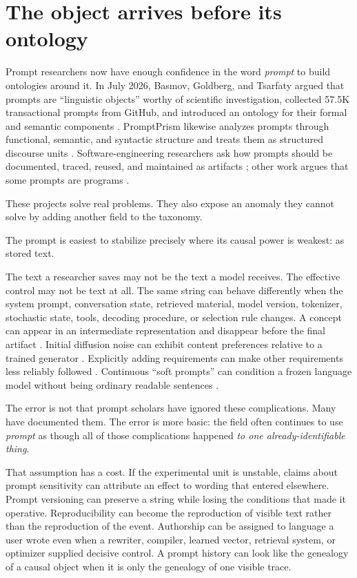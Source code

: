 \documentclass[11pt]{article}
\begin{document}
\section{The object arrives before its ontology}

Prompt researchers now have enough confidence in the word \emph{prompt} to build ontologies around it. In July 2026, Basmov, Goldberg, and Tsarfaty argued that prompts are ``linguistic objects'' worthy of scientific investigation, collected 57.5K transactional prompts from GitHub, and introduced an ontology for their formal and semantic components \citep{Basmov2026PromptsWild}. PromptPrism likewise analyzes prompts through functional, semantic, and syntactic structure and treats them as structured discourse units \citep{Jeoung2026PromptPrism}. Software-engineering researchers ask how prompts should be documented, traced, reused, and maintained as artifacts \citep{Villamizar2025PromptsArtifacts}; other work argues that some prompts are programs \citep{Liang2025PromptsPrograms}.

These projects solve real problems. They also expose an anomaly they cannot solve by adding another field to the taxonomy.

The prompt is easiest to stabilize precisely where its causal power is weakest: as stored text.

The text a researcher saves may not be the text a model receives. The effective control may not be text at all. The same string can behave differently when the system prompt, conversation state, retrieved material, model version, tokenizer, stochastic state, tools, decoding procedure, or selection rule changes. A concept can appear in an intermediate representation and disappear before the final artifact \citep{Agarwal2023ASTAR}. Initial diffusion noise can exhibit content preferences relative to a trained generator \citep{Mao2023InitialImageEditing}. Explicitly adding requirements can make other requirements less reliably followed \citep{Yang2025PromptsDontSay}. Continuous ``soft prompts'' can condition a frozen language model without being ordinary readable sentences \citep{Lester2021PromptTuning}.

The error is not that prompt scholars have ignored these complications. Many have documented them. The error is more basic: the field often continues to use \emph{prompt} as though all of those complications happened \emph{to one already-identifiable thing}.

That assumption has a cost. If the experimental unit is unstable, claims about prompt sensitivity can attribute an effect to wording that entered elsewhere. Prompt versioning can preserve a string while losing the conditions that made it operative. Reproducibility can become the reproduction of visible text rather than the reproduction of the event. Authorship can be assigned to language a user wrote even when a rewriter, compiler, learned vector, retrieval system, or optimizer supplied decisive control. A prompt history can look like the genealogy of a causal object when it is only the genealogy of one visible trace.
\end{document}
